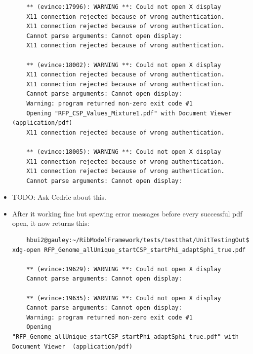 \documentclass[12pt,hyperref]{labbook}
\begin{document}
\begin{itemize}
\begin{lstlisting}
    ** (evince:17996): WARNING **: Could not open X display
    X11 connection rejected because of wrong authentication.
    X11 connection rejected because of wrong authentication.
    Cannot parse arguments: Cannot open display: 
    X11 connection rejected because of wrong authentication.

    ** (evince:18002): WARNING **: Could not open X display
    X11 connection rejected because of wrong authentication.
    X11 connection rejected because of wrong authentication.
    Cannot parse arguments: Cannot open display: 
    Warning: program returned non-zero exit code #1
    Opening "RFP_CSP_Values_Mixture1.pdf" with Document Viewer  (application/pdf)
    X11 connection rejected because of wrong authentication.

    ** (evince:18005): WARNING **: Could not open X display
    X11 connection rejected because of wrong authentication.
    X11 connection rejected because of wrong authentication.
    Cannot parse arguments: Cannot open display: 
    \end{lstlisting}
    \item TODO: Ask Cedric about this.
    \item After it working fine but spewing error messages before every successful pdf open, it now returns this:
    \begin{lstlisting}
    hbui2@gauley:~/RibModelFramework/tests/testthat/UnitTestingOut$ xdg-open RFP_Genome_allUnique_startCSP_startPhi_adaptSphi_true.pdf 

    ** (evince:19629): WARNING **: Could not open X display
    Cannot parse arguments: Cannot open display: 

    ** (evince:19635): WARNING **: Could not open X display
    Cannot parse arguments: Cannot open display: 
    Warning: program returned non-zero exit code #1
    Opening "RFP_Genome_allUnique_startCSP_startPhi_adaptSphi_true.pdf" with Document Viewer  (application/pdf)


\end{lstlisting}
\end{itemize}
\end{document}
